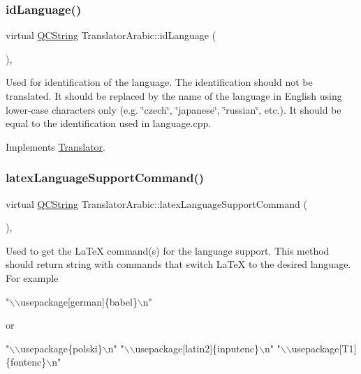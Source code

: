 \subsubsection{\texorpdfstring{idLanguage()}{idLanguage()}}
{\footnotesize\ttfamily virtual \mbox{\hyperlink{class_q_c_string}{Q\+C\+String}} Translator\+Arabic\+::id\+Language (\begin{DoxyParamCaption}{ }\end{DoxyParamCaption})\hspace{0.3cm}{\ttfamily [inline]}, {\ttfamily [virtual]}}

Used for identification of the language. The identification should not be translated. It should be replaced by the name of the language in English using lower-\/case characters only (e.\+g. \char`\"{}czech\char`\"{}, \char`\"{}japanese\char`\"{}, \char`\"{}russian\char`\"{}, etc.). It should be equal to the identification used in language.\+cpp. 

Implements \mbox{\hyperlink{class_translator}{Translator}}.

\mbox{\label{class_translator_arabic_a7f564cd879f1c9a2f2e955773bfb8da0}} 
\subsubsection{\texorpdfstring{latexLanguageSupportCommand()}{latexLanguageSupportCommand()}}
{\footnotesize\ttfamily virtual \mbox{\hyperlink{class_q_c_string}{Q\+C\+String}} Translator\+Arabic\+::latex\+Language\+Support\+Command (\begin{DoxyParamCaption}{ }\end{DoxyParamCaption})\hspace{0.3cm}{\ttfamily [inline]}, {\ttfamily [virtual]}}

Used to get the La\+TeX command(s) for the language support. This method should return string with commands that switch La\+TeX to the desired language. For example 
\begin{DoxyPre}"\(\backslash\)\(\backslash\)usepackage[german]\{babel\}\(\backslash\)n"
 \end{DoxyPre}
 or 
\begin{DoxyPre}"\(\backslash\)\(\backslash\)usepackage\{polski\}\(\backslash\)n"
 "\(\backslash\)\(\backslash\)usepackage[latin2]\{inputenc\}\(\backslash\)n"
 "\(\backslash\)\(\backslash\)usepackage[T1]\{fontenc\}\(\backslash\)n"
 \end{DoxyPre}


